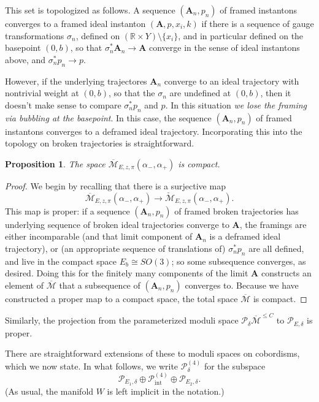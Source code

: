 \documentclass{memo-l}
\newtheorem{proposition}[theorem]{Proposition}
\theoremstyle{definition}
\theoremstyle{remark}
\numberwithin{section}{chapter}
\numberwithin{equation}{chapter}
\begin{document}
This set is topologized as follows. A sequence $(\mathbf{A}_n,p_n)$ of framed instantons converges to a framed ideal instanton $(\mathbf{A},p,x_i,k)$ if there is a sequence of gauge transformations $\sigma_n$, defined on $(\mathbb R \times Y) \setminus \{x_i\}$, and in particular defined on the basepoint $(0,b)$, so that $\sigma_n^*\mathbf{A}_n \to \mathbf{A}$ converge in the sense of ideal instantons above, and $\sigma_n^*p_n \to p$.

However, if the underlying trajectores $\mathbf{A}_n$ converge to an ideal trajectory with nontrivial weight at $(0,b)$, so that the $\sigma_n$ are undefined at $(0,b)$, then it doesn't make sense to compare $\sigma_n^*p_n$ and $p$. In this situation \emph{we lose the framing via bubbling at the basepoint}. In this case, the sequence $(\mathbf{A}_n,p_n)$ of framed instantons converges to a deframed ideal trajectory. Incorporating this into the topology on broken trajectories is straightforward.

\begin{proposition}The space $\overline{\mathcal M}_{E,z,\pi}(\alpha_-, \alpha_+)$ is compact.
\end{proposition}

\begin{proof}We begin by recalling that there is a surjective map $$\overline{\mathcal M}_{E,z,\pi}(\alpha_-, \alpha_+) \to \check{\mathcal M}_{E,z,\pi}(\alpha_-,\alpha_+).$$ This map is proper: if a sequence $(\mathbf{A}_n,p_n)$ of framed broken trajectories has underlying sequence of broken ideal trajectories converge to $\mathbf{A}$, the framings are either incomparable (and that limit component of $\mathbf{A}_n$ is a deframed ideal trajectory), or (an appropriate sequence of translations of) $\sigma_n^*p_n$ are all defined, and live in the compact space $E_b \cong SO(3)$; so some subsequence converges, as desired. Doing this for the finitely many components of the limit $\mathbf{A}$ constructs an element of $\overline{\mathcal M}$ that a subsequence of $(\mathbf{A}_n, p_n)$ converges to.
Because we have constructed a proper map to a compact space, the total space $\overline{\mathcal M}$ is compact.
\end{proof}

Similarly, the projection from the parameterized moduli space $\mathcal P_\delta \overline{\mathcal M}^{\leq C}$ to $\mathcal P_{E, \delta}$ is proper.

There are straightforward extensions of these to moduli spaces on cobordisms, which we now state. In what follows, we write $\mathcal P^{(4)}_\delta$ for the subspace $$\mathcal P_{E_1, \delta} \oplus \mathcal P^{(4)}_{\text{int}} \oplus \mathcal P_{E_2, \delta}.$$  
(As usual, the manifold $W$ is left implicit in the notation.) 
\end{document}
